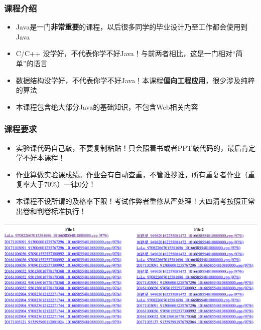 \begin{frame}
  \frametitle{课程介绍}
  \begin{itemize}
    \item Java是一门\textbf{非常重要}的课程，以后很多同学的毕业设计乃至工作都会使用到Java
    \item C/C++ 没学好，不代表你学不好Java！与前两者相比，这是一门相对“简单”的语言
    \item 数据结构没学好，不代表你学不好Java！本课程\textbf{偏向工程应用}，很少涉及纯粹的算法
    \item 本课程包含绝大部分Java的基础知识，不包含Web相关内容
  \end{itemize}
\end{frame}

\begin{frame}
  \frametitle{课程要求}
  \begin{itemize}
    \item 实验课代码自己敲，不要复制粘贴！只会照着书或者PPT敲代码的，最后肯定学不好本课程！
    \item 作业算做实验课成绩。作业会有自动查重，不管谁抄谁，所有重复者作业（重复率大于70\%）一律0分！
    \item 本课程不设所谓的及格率下限！考试作弊者重修从严处理！大四清考按照正常出卷和判卷标准执行！
  \end{itemize}
  \includegraphics[width=\textwidth]{figures/moss}
\end{frame}


